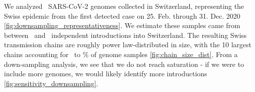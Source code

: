 \documentclass[9pt,twocolumn,twoside,lineno]{pnas-new}
\begin{document}
We analyzed \nfocalsamples\ SARS-CoV-2 genomes collected in Switzerland, representing the Swiss epidemic from the first detected case on 25. Feb. through 31. Dec. 2020 \ref{fig:downsampling_representativeness}. We estimate these samples came from between \nchainsmin\ and \nchainsmax\ independent introductions into Switzerland. The resulting Swiss transmission chains are roughly power law-distributed in size, with the 10 largest chains accounting for \maxlargestchainsper\ to \minlargestchainsper \% of genome samples \ref{fig:chain_size_dist}. From a down-sampling analysis, we see that we do not reach saturation - if we were to include more genomes, we would likely identify more introductions \ref{fig:sensitivity_downsampling}. 



\end{document}

